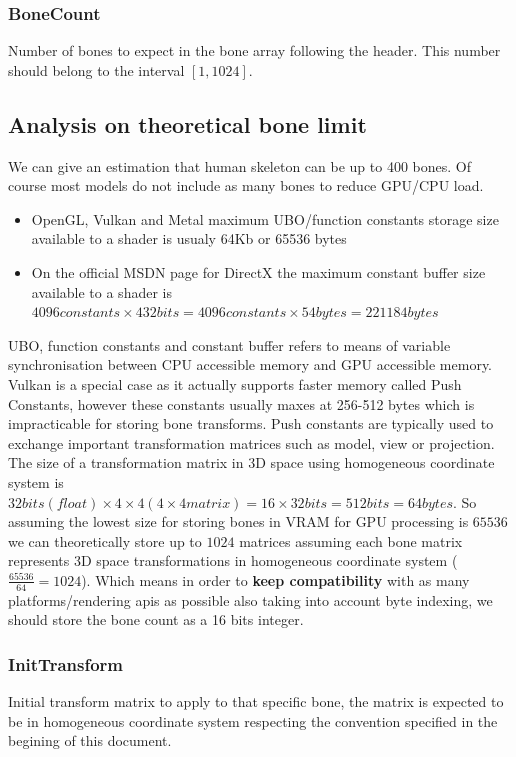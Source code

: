 \subsubsection{BoneCount}
Number of bones to expect in the bone array following the header. This number should belong to the interval $[1, 1024]$.

\subsection{Analysis on theoretical bone limit}
We can give an estimation that human skeleton can be up to 400 bones. Of course most models do not include as many bones to reduce GPU/CPU load.
\begin{itemize}
    \item OpenGL, Vulkan and Metal maximum UBO/function constants storage size available to a shader is usualy 64Kb or 65536 bytes
    \item On the official MSDN page \cite{MSDNConstantBuffers} for DirectX the maximum constant buffer size available to a shader is $4096 constants \times 432 bits = 4096 constants \times 54 bytes = 221184 bytes$
\end{itemize}
UBO, function constants and constant buffer refers to means of variable synchronisation between CPU accessible memory and GPU accessible memory. Vulkan is a special case as it actually supports faster memory called Push Constants, however these constants usually maxes at 256-512 bytes which is impracticable for storing bone transforms. Push constants are typically used to exchange important transformation matrices such as model, view or projection.
The size of a transformation matrix in 3D space using homogeneous coordinate system \cite{HomogeneousCoordinates} is $32 bits (float) \times 4 \times 4 (4\times4 matrix) = 16 \times 32 bits = 512 bits = 64 bytes$.\newline
So assuming the lowest size for storing bones in VRAM for GPU processing is $65536$ we can theoretically store up to $1024$ matrices assuming each bone matrix represents 3D space transformations in homogeneous coordinate system ($\frac{65536}{64} = 1024$).\newline
Which means in order to \textbf{keep compatibility} with as many platforms/rendering apis as possible also taking into account byte indexing, we should store the bone count as a 16 bits integer.

\subsubsection{InitTransform}
Initial transform matrix to apply to that specific bone, the matrix is expected to be in homogeneous coordinate system \cite{HomogeneousCoordinates} respecting the convention specified in the begining of this document.

